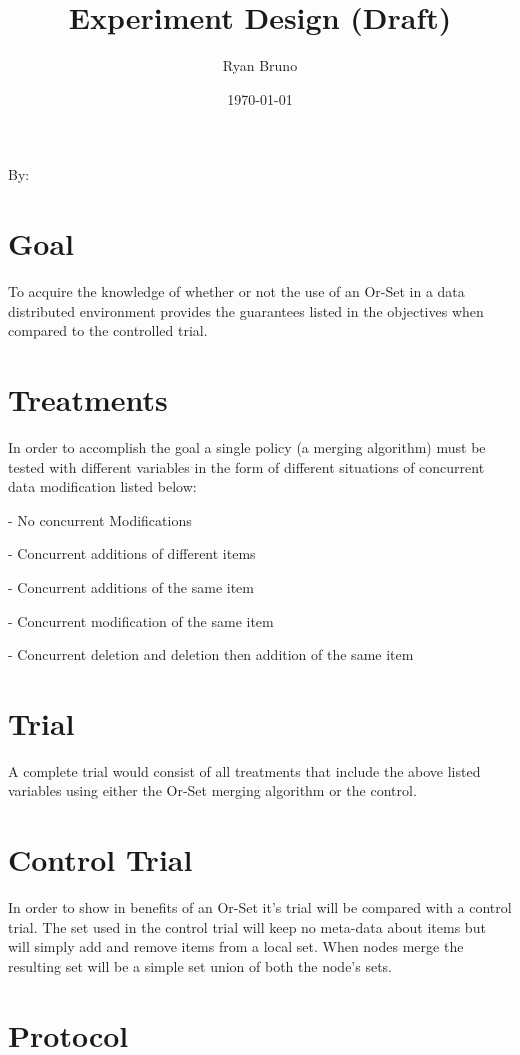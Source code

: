 \documentclass{article}
\title{Experiment Design (Draft)}
\author{Ryan Bruno}
\date{\today}
\renewcommand{\maketitle}{
    \begin{center}
        \Huge\textbf{\thetitle}
    \end{center}
    \begin{multicols}{2}
        \begin{flushright}
        By: \theauthor
        \end{flushright}

        \columnbreak
        
        \thedate
    \end{multicols}
}
\begin{document}
\maketitle

\section*{Goal}

To acquire the knowledge of whether or not the use of an Or-Set in a data distributed environment provides the guarantees listed in the objectives when compared to the controlled trial.

\section*{Treatments}

In order to accomplish the goal a single policy (a merging algorithm) must be tested with different variables in the form of different situations of concurrent data modification listed below:

    - No concurrent Modifications

    - Concurrent additions of different items

    - Concurrent additions of the same item

    - Concurrent modification of the same item

    - Concurrent deletion and deletion then addition of the same item

\section*{Trial}

A complete trial would consist of all treatments that include the above listed variables using either the Or-Set merging algorithm or the control.

\section*{Control Trial}

In order to show in benefits of an Or-Set it's trial will be compared with a control trial. The set used in the control trial will keep no meta-data about items but will simply add and remove items from a local set. When nodes merge the resulting set will be a simple set union of both the node's sets.

\section*{Protocol}
\end{document}
